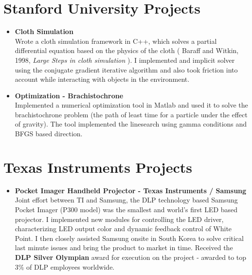\documentclass[line, 11pt]{res}
\renewenvironment{resume}{\begingroup}{\endgroup}
\begin{document}
\begin{resume}
\begin{itemize}
    \end{itemize}

\vspace{-10pt}
\section{Stanford University Projects}
    \begin{itemize}
        \item \textbf{Cloth Simulation}\\
        Wrote a cloth simulation framework in C++, which solves a partial
        differential equation based on the physics of the cloth ( Baraff and
        Witkin, 1998, \emph{Large Steps in cloth simulation} ).
        I implemented and implicit solver using the  conjugate gradient iterative algorithm
        and also took friction into account while interacting
        with objects in the environment.

        \item \textbf{Optimization - Brachistochrone}\\
        Implemented a numerical optimization tool in Matlab and used it to
        solve the brachistochrone problem (the path of least time for a
        particle under the effect of gravity). The tool implemented the
        linesearch using gamma conditions and BFGS based direction.
    
    \end{itemize}

\vspace{-10pt}
\section{Texas Instruments Projects}
    \begin{itemize}
        \item \textbf{Pocket Imager Handheld Projector - Texas Instruments / Samsung}\\
        Joint effort between TI and Samsung, the DLP technology based Samsung
        Pocket Imager (P300 model) was the smallest and world's first LED
        based projector. I implemented new modules for controlling the LED
        driver, characterizing LED output color and dynamic feedback control 
        of White Point. I then closely assisted Samsung onsite in South Korea to solve 
        critical last minute issues and bring the product to market in time. Received the \textbf{DLP Silver 
        Olympian} award for execution on the project - awarded to top 3\% of DLP employees worldwide.


\end{itemize}
\end{resume}
\end{document}
